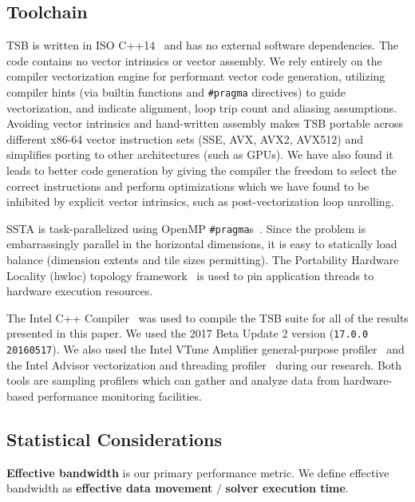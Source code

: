 \documentclass{sig-alternate-05-2015}
\begin{document}
\subsection{Toolchain}
\label{sec:experimental_setup:toolchain}

TSB is written in ISO C++14~\cite{cxx14} and has no external software
  dependencies.
The code contains no vector intrinsics or vector assembly.
We rely entirely on the compiler vectorization engine for performant vector
  code generation, utilizing compiler hints (via builtin functions and
  \lstinline{#pragma} directives) to guide vectorization, and indicate alignment,
  loop trip count and aliasing assumptions.
Avoiding vector intrinsics and hand-written assembly makes TSB 
  portable across different x86-64 vector instruction sets (SSE, AVX, AVX2,
  AVX512) and simplifies porting to other architectures (such as GPUs).
We have also found it leads to better code generation by giving the compiler
  the freedom to select the correct instructions and perform optimizations which
  we have found to be inhibited by explicit vector intrinsics, such as
  post-vectorization loop unrolling.

SSTA is task-parallelized using OpenMP \lstinline{#pragma}s~\cite{openmp}.
Since the problem is embarrassingly parallel in the horizontal dimensions, it
  is easy to statically load balance (dimension extents and tile sizes
  permitting).
The Portability Hardware Locality (hwloc) topology
  framework~\cite{hwloc} is used to pin application threads to hardware execution
  resources.

The Intel C++ Compiler~\cite{intel_cpp_compiler} was used to compile the TSB
  suite for all of the results presented in this paper.
We used the 2017 Beta Update 2 version (\lstinline{17.0.0 20160517}).
We also used the Intel VTune Amplifier general-purpose
  profiler~\cite{intel_vtune_amplifier} and the Intel Advisor vectorization and
  threading profiler~\cite{intel_advisor} during our research.
Both tools are sampling profilers which can gather and analyze data from
  hardware-based performance monitoring facilities.

\subsection{Statistical Considerations}
\label{sec:experimental_setup:stats}

\textbf{Effective bandwidth} is our primary performance metric.
We define effective bandwidth as \textbf{effective data movement} \(/\)
  \textbf{solver execution time}.
\end{document}
